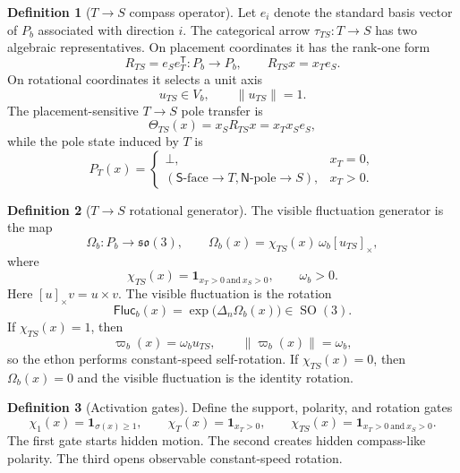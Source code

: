 \documentclass[11pt]{article}
\theoremstyle{definition}
\newtheorem{definition}{Definition}[section]
\theoremstyle{plain}
\newcommand{\Fluc}{\mathsf{Fluc}}
\newcommand{\Npole}{\mathsf N}
\newcommand{\Spole}{\mathsf S}
\DeclareMathOperator{\SO}{SO}
\begin{document}
\begin{definition}[\(T\to S\) compass operator]
Let \(e_i\) denote the standard basis vector of \(P_b\) associated with
direction \(i\).  The categorical arrow \(\tau_{TS}:T\to S\) has two
algebraic representatives.  On placement coordinates it has the
rank-one form
\[
  R_{TS}
  =
  e_Se_T^\mathsf{T}:P_b\to P_b,
  \qquad
  R_{TS}x=x_Te_S.
\]
On rotational coordinates it selects a unit axis
\[
  u_{TS}\in V_b,
  \qquad
  \|u_{TS}\|=1.
\]
The placement-sensitive \(T\to S\) pole transfer is
\[
  \Theta_{TS}(x)
  =
  x_SR_{TS}x
  =
  x_Tx_Se_S,
\]
while the pole state induced by \(T\) is
\[
  P_T(x)
  =
  \begin{cases}
    \bot, & x_T=0,\\
    (\Spole\text{-face}\to T,\Npole\text{-pole}\to S),& x_T>0.
  \end{cases}
\]
\end{definition}

\begin{definition}[\(T\to S\) rotational generator]
The visible fluctuation generator is the map
\[
  \Omega_b:P_b\to\mathfrak{so}(3),
  \qquad
  \Omega_b(x)
  =
  \chi_{TS}(x)\,\omega_b[u_{TS}]_\times,
\]
where
\[
  \chi_{TS}(x)=\mathbf 1_{x_T>0\ \mathrm{and}\ x_S>0},
  \qquad
  \omega_b>0.
\]
Here \([u]_\times v=u\times v\).  The visible fluctuation is the rotation
\[
  \Fluc_b(x)
  =
  \exp\!\bigl(\Delta_n\Omega_b(x)\bigr)\in\SO(3).
\]
If \(\chi_{TS}(x)=1\), then
\[
  \varpi_b(x)=\omega_bu_{TS},
  \qquad
  \|\varpi_b(x)\|=\omega_b,
\]
so the ethon performs constant-speed self-rotation.  If
\(\chi_{TS}(x)=0\), then \(\Omega_b(x)=0\) and the visible fluctuation is
the identity rotation.
\end{definition}

\begin{definition}[Activation gates]
Define the support, polarity, and rotation gates
\[
  \chi_1(x)=\mathbf 1_{\sigma(x)\geq1},
  \qquad
  \chi_T(x)=\mathbf 1_{x_T>0},
  \qquad
  \chi_{TS}(x)=\mathbf 1_{x_T>0\ \mathrm{and}\ x_S>0}.
\]
The first gate starts hidden motion.  The second creates hidden
compass-like polarity.  The third opens observable constant-speed
rotation.
\end{definition}
\end{document}
